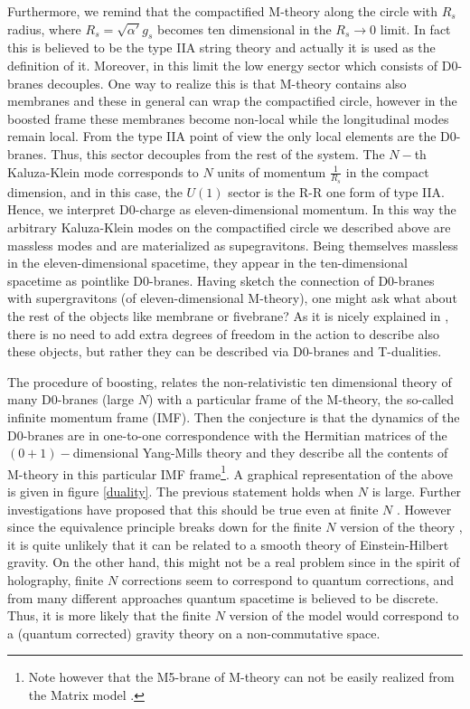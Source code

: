 \documentclass[11pt,english]{article}
\numberwithin{equation}{section}
\begin{document}
Furthermore, we remind  that the compactified M-theory along the circle with $R_s$ radius, where $R_s=\sqrt{\alpha'}g_s$ becomes ten dimensional in the $R_s\to 0$ limit. In fact this is believed to be the type IIA string theory and actually it is used as the definition of it. Moreover, in this limit the low energy sector which consists of D0-branes decouples. One way to realize this is that M-theory contains also membranes and these in general can wrap the compactified circle, however in the boosted frame these membranes  become non-local while the longitudinal modes remain local. From the type IIA point of view the only local elements are the D0-branes. Thus, this sector decouples from the rest of the system. The $N-$th Kaluza-Klein mode corresponds to $N$ units of momentum $\frac{1}{R_s}$ in the compact dimension, and in this case, the $U(1)$ sector is the R-R one form of type IIA. Hence, we interpret D0-charge as eleven-dimensional momentum. In this way the arbitrary Kaluza-Klein modes on the compactified circle we described above are massless modes and are materialized as supegravitons. Being themselves massless in the eleven-dimensional spacetime, they appear in the ten-dimensional spacetime as pointlike D0-branes.  Having sketch  the connection of D0-branes with supergravitons (of eleven-dimensional M-theory), one might ask what about the rest of the objects like  membrane or fivebrane? As it is nicely explained in \cite{Sen1998}, there is no need to add extra degrees of freedom in the action to describe also these objects, but rather they can be described via D0-branes and T-dualities. 

The procedure of boosting, relates the non-relativistic ten dimensional theory of many D0-branes (large $N$) with a particular frame of the M-theory, the so-called infinite momentum frame (IMF). Then the conjecture is that the dynamics of the D0-branes are in one-to-one correspondence with the Hermitian matrices of the $(0+1)-$dimensional Yang-Mills theory  and they describe all the contents of M-theory in this particular IMF frame\footnote{Note however that the M5-brane of M-theory can not be easily realized from the Matrix model \cite{Berenstein2002}.}. A graphical representation of the above is given in figure \ref{duality}. The previous statement holds when $N$ is large. Further investigations have proposed that this should be true even at finite $N$ \cite{Susskind1997}. However since the equivalence principle breaks down for the finite $N$ version of the theory \cite{Taylor2000a}, \cite{Kabat1998} it is quite unlikely that it can be related to a smooth theory of Einstein-Hilbert gravity. On the other hand, this might not be a real problem since in the spirit of holography, finite $N$ corrections seem to correspond to quantum corrections, and from many different approaches quantum spacetime is believed to be discrete. Thus, it is more likely that the finite $N$ version of the model would correspond to a (quantum corrected) gravity theory on a non-commutative space. 
\end{document}
